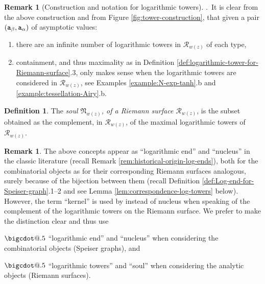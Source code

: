 \documentclass[final,3p,times]{elsarticle}
\makeatletter
\newcommand{\R}{\ensuremath{{\mathcal R}}}
\newcommand*\bigcdot{\mathpalette\bigcdot@{.5}}
\newcommand*\bigcdot@[2]{\mathbin{\vcenter{\hbox{\scalebox{#2}{$\m@th#1\bullet$}}}}}
\theoremstyle{definition}
\newtheorem{definition}[theorem]{Definition}
\newtheorem{remark}[theorem]{Remark}
\makeatother
\begin{document}
\begin{remark}[Construction and notation for logarithmic towers]
.\
It is clear from the above construction and from Figure \ref{fig:tower-construction}, that
given a pair $({\tt a}_{\beta}, {\tt a}_{\alpha})$ of asymptotic values:
\begin{enumerate}[label=\alph*),leftmargin=*]
\item
there are an infinite number of logarithmic towers 
in $\R_{w(z)}$ of each type,

\item
containment, and thus maximality as in Definition \ref{def:logarithmic-tower-for-Riemann-surface}.3, 
only makes sense when the logarithmic towers are considered 
in $\R_{w(z)}$,
see Examples \ref{example:N-exp-tanh}.b and \ref{example:tessellation-Airy}.b.
\end{enumerate}
\end{remark} 


\begin{definition}
\label{def:soul-of-surface}
The \emph{soul $\mathfrak{N}_{w(z)}$,  
of a Riemann surface $\R_{w(z)}$},
is the subset obtained as the complement, in $\R_{w(z)}$, of the
maximal logarithmic towers of $\R_{w(z)}$.
\end{definition} 


\begin{remark}
\label{nomenclatura-logarithmic-tower}
The above concepts appear as ``logarithmic end'' and ``nucleus'' 
in the classic literature (recall Remark \ref{rem:historical-origin-log-ends}),
both for the combinatorial objects as for 
their corresponding Riemann surfaces analogous,
surely because of the bijection between them 
(recall Definition \ref{def:Log-end-for-Speiser-graph}.1--2 and see
Lemma \ref{lem:correspondence-log-towers} below).
However, the term ``kernel'' is used by \cite{GoldbergOstrovskii} instead of
nucleus when speaking of the complement of the logarithmic towers on 
the Riemann surface.
We prefer to make the distinction clear and thus use

\noindent 
$\bigcdot$
``logarithmic end'' and ``nucleus'' when considering the combinatorial
objects (Speiser graphs), and 

\noindent 
$\bigcdot$
``logarithmic towers'' and ``soul''
when considering the analytic objects
(Riemann surfaces).
\end{remark}
\end{document}
